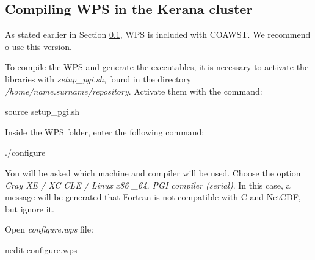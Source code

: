 \subsection{Compiling WPS in the Kerana cluster}\label{wpsker}
\bigskip

\begin{tcolorbox}[enhanced,
    grow to left by=0cm,%
    grow to right by=0cm,%
    enlarge top by=0cm,%
    enlarge bottom by=0cm,%
    tcbox raise base,
    boxrule=1.0pt,
    left=18mm,
    colframe=red!50!black,coltext=red!25!black,colback=red!10!white,
    overlay={\begin{tcbclipinterior}\fill[red!75!blue!50!white] (frame.south west)
      rectangle node[text=white,font=\sffamily\bfseries\footnotesize,rotate=0] {WARNING} ([xshift=18mm]frame.north west);\end{tcbclipinterior}}]
      As stated earlier in Section \textcolor{bleu_cite}{\ref{wpsker}}, WPS is included with COAWST. We recommend o use this version.
\end{tcolorbox}
\bigskip

\noindent To compile the WPS and generate the executables, it is necessary to activate the libraries with \textit{setup\_pgi.sh},
found in the directory \textit{/home/name.surname/repository}. Activate them with the command:
\bigskip

\begin{bashcode}
source setup_pgi.sh
\end{bashcode}
\bigskip

\noindent Inside the WPS folder, enter the following command:
\bigskip

\begin{bashcode}
./configure
\end{bashcode}
\bigskip

\noindent You will be asked which machine and compiler will be used. Choose the option 
\textit{Cray XE / XC CLE / Linux x86 \_64, PGI compiler (serial)}. In this case, a message will be generated that Fortran is not compatible 
with C and NetCDF, but ignore it.
\bigskip

\noindent Open \textit{configure.wps} file:
\bigskip

\begin{bashcode}
nedit configure.wps
\end{bashcode}
\bigskip

